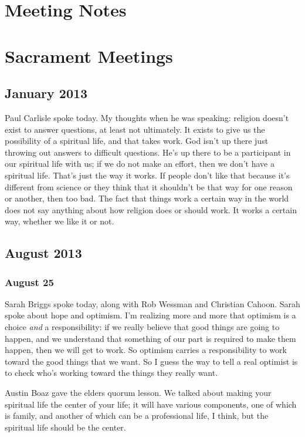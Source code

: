 \section{Meeting Notes}

\section{Sacrament Meetings}

\subsection{January 2013}

Paul Carlisle spoke today. My thoughts when he was speaking: religion doesn't exist to answer questions, at least not ultimately. It exists to give us the possibility of a spiritual life, and that takes work. God isn't up there just throwing out answers to difficult questions. He's up there to be a participant in our spiritual life with us; if we do not make an effort, then we don't have a spiritual life. That's just the way it works. If people don't like that because it's different from science or they think that it shouldn't be that way for one reason or another, then too bad. The fact that things work a certain way in the world does not say anything about how religion does or should work. It works a certain way, whether we like it or not.

\subsection{August 2013}

\subsubsection{August 25}

Sarah Briggs spoke today, along with Rob Wessman and Christian Cahoon. Sarah spoke about hope and optimism. I'm realizing more and more that optimism is a choice \textit{and} a responsibility: if we really believe that good things are going to happen, and we understand that something of our part is required to make them happen, then we will get to work. So optimism carries a responsibility to work toward the good things that we want. So I guess the way to tell a real optimist is to check who's working toward the things they really want.

Austin Boaz gave the elders quorum lesson. We talked about making your spiritual life the center of your life; it will have various components, one of which is family, and another of which can be a professional life, I think, but the spiritual life should be the center.


